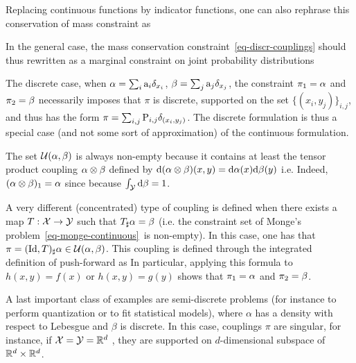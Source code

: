 Replacing continuous functions by indicator functions, one can also rephrase this conservation of mass constraint as

In the general case, the mass conservation constraint~\eqref{eq-discr-couplings} should thus rewritten as a marginal constraint on joint probability distributions

The discrete case, when $\alpha=\sum_i \mathrm{a}_i \delta_{x_i}$, $\beta=\sum_j \mathrm{a}_j \delta_{x_j}$, the constraint $\pi_1=\alpha$ and $\pi_2=\beta$ necessarily imposes that $\pi$ is discrete, supported on the set $\{(x_i,y_j)\}_{i,j}$, and thus has the form $\pi = \sum_{i,j} \mathrm{P}_{i,j} \delta_{(x_i,y_j)}$. The discrete formulation is thus a special case (and not some sort of approximation) of the continuous formulation. 

The set $\mathcal{U}(\alpha,\beta)$ is always non-empty because it contains at least the tensor product coupling $\alpha \otimes \beta$ defined by $\mathrm{d}(\alpha\otimes\beta)(x,y)=\mathrm{d}\alpha(x)\mathrm{d}\beta(y)$ i.e.
Indeed, $(\alpha\otimes\beta)_1 = \alpha$ since
because $\int_{\mathcal{Y}} \mathrm{d}\beta=1$.

A very different (concentrated) type of coupling is defined when there exists a map $T: \mathcal{X} \rightarrow \mathcal{Y}$ such that $T_\sharp \alpha = \beta$ (i.e. the constraint set of Monge's problem~\eqref{eq-monge-continuous} is non-empty). In this case, one has that $\pi = (\mathrm{Id},T)_\sharp \alpha \in \mathcal{U}(\alpha,\beta)$. This coupling is defined through the integrated definition of push-forward as
In particular, applying this formula to $h(x,y)=f(x)$ or $h(x,y)=g(y)$  shows that $\pi_1=\alpha$ and $\pi_2=\beta$.

A last important class of examples are semi-discrete problems (for instance to perform quantization or to fit statistical models), where $\alpha$ has a density with respect to Lebesgue and $\beta$ is discrete. In this case, couplings $\pi$ are singular, for instance, if $\mathcal{X}=\mathcal{Y}=\mathbb{R}^d$ , they are supported on $d$-dimensional subspace of $\mathbb{R}^d \times \mathbb{R}^d$. 


